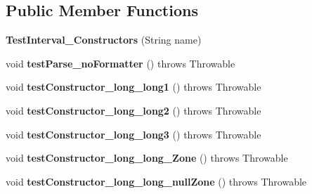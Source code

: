 \subsection*{Public Member Functions}
\begin{DoxyCompactItemize}
\item 
\hypertarget{classorg_1_1joda_1_1time_1_1_test_interval___constructors_a9cb7fb491d896d04748e7141441a2f6b}{{\bfseries Test\-Interval\-\_\-\-Constructors} (String name)}\label{classorg_1_1joda_1_1time_1_1_test_interval___constructors_a9cb7fb491d896d04748e7141441a2f6b}

\item 
\hypertarget{classorg_1_1joda_1_1time_1_1_test_interval___constructors_a39d167a3730820585c8d33ab76415702}{void {\bfseries test\-Parse\-\_\-no\-Formatter} ()  throws Throwable }\label{classorg_1_1joda_1_1time_1_1_test_interval___constructors_a39d167a3730820585c8d33ab76415702}

\item 
\hypertarget{classorg_1_1joda_1_1time_1_1_test_interval___constructors_aea827fe6d66ba77c4b70bd8f0168eba6}{void {\bfseries test\-Constructor\-\_\-long\-\_\-long1} ()  throws Throwable }\label{classorg_1_1joda_1_1time_1_1_test_interval___constructors_aea827fe6d66ba77c4b70bd8f0168eba6}

\item 
\hypertarget{classorg_1_1joda_1_1time_1_1_test_interval___constructors_adce76589123898d7369fa5bfb1a7aae7}{void {\bfseries test\-Constructor\-\_\-long\-\_\-long2} ()  throws Throwable }\label{classorg_1_1joda_1_1time_1_1_test_interval___constructors_adce76589123898d7369fa5bfb1a7aae7}

\item 
\hypertarget{classorg_1_1joda_1_1time_1_1_test_interval___constructors_a9fc98f81009fc712012ce0de73466626}{void {\bfseries test\-Constructor\-\_\-long\-\_\-long3} ()  throws Throwable }\label{classorg_1_1joda_1_1time_1_1_test_interval___constructors_a9fc98f81009fc712012ce0de73466626}

\item 
\hypertarget{classorg_1_1joda_1_1time_1_1_test_interval___constructors_ab5f25c853ed2b94f0e1111891c5309ad}{void {\bfseries test\-Constructor\-\_\-long\-\_\-long\-\_\-\-Zone} ()  throws Throwable }\label{classorg_1_1joda_1_1time_1_1_test_interval___constructors_ab5f25c853ed2b94f0e1111891c5309ad}

\item 
\hypertarget{classorg_1_1joda_1_1time_1_1_test_interval___constructors_a35c2cd7b4ef45ed8a6a2205df9aecace}{void {\bfseries test\-Constructor\-\_\-long\-\_\-long\-\_\-null\-Zone} ()  throws Throwable }\label{classorg_1_1joda_1_1time_1_1_test_interval___constructors_a35c2cd7b4ef45ed8a6a2205df9aecace}


\end{DoxyCompactItemize}
